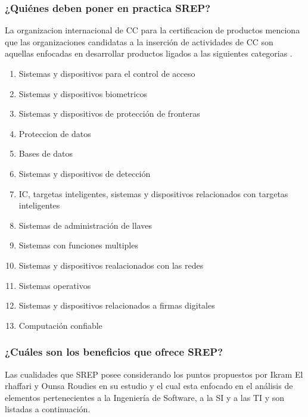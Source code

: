 \documentclass[runningheads,a4paper]{llncs}
\begin{document}
\subsubsection{¿Quiénes deben poner en practica \gls{SREP}?}
La organizacion internacional de \gls{CC} para la certificacion de productos menciona que las organizaciones candidatas a la inserción de actividades de \gls{CC} son aquellas enfocadas en desarrollar productos ligados a las siguientes categorias \cite{CCStat}.

\begin{enumerate}
	\item Sistemas y dispositivos para el control de acceso
	\item Sistemas y dispositivos biometricos
	\item Sistemas  y dispositivos de protección de fronteras
	\item Proteccion de datos
	\item Bases de datos
	\item Sistemas y dispositivos de detección
	\item \gls{IC}, targetas inteligentes, sistemas y dispositivos relacionados con targetas inteligentes
	\item Sistemas de administración de llaves
	\item Sistemas con funciones multiples
	\item Sistemas y dispositivos realacionados con las redes
	\item Sistemas operativos
	\item Sistemas y dispositivos relacionados a firmas digitales
	\item Computación confiable 
\end{enumerate}

\subsubsection{¿Cuáles son los beneficios que ofrece \gls{SREP}?}
Las cualidades que \gls{SREP} posee considerando los puntos propuestos por Ikram El rhaffari y Ounsa Roudies en su estudio y el cual esta enfocado en el análisis de elementos pertenecientes a la Ingeniería de \gls{Software}, a la \gls{SI} y a las \gls{TI} y son listadas a continuación.  
\end{document}
